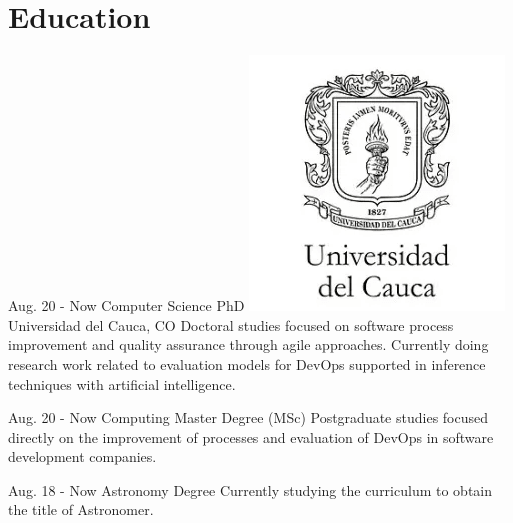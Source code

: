 \documentclass[american]{cv-class}
\begin{document}
\section{Education}
\begin{entrylist}
	\entry
	{Aug. 20 - Now}
	{Computer Science PhD}
	{{\includegraphics[scale=0.05]{img/unicauca-logo.png}} Universidad del Cauca, CO} 
	{Doctoral studies focused on software process improvement and quality assurance through agile approaches. Currently doing research work related to evaluation models for DevOps supported in inference techniques with artificial intelligence.}
	
	\entry
	{Aug. 20 - Now}
	{Computing Master Degree (MSc)}
	{ }
	{Postgraduate studies focused directly on the improvement of processes and evaluation of DevOps in software development companies.}
	
	\entry
	{Aug. 18 - Now}
	{Astronomy Degree}
	{ }
	{Currently studying the curriculum to obtain the title of Astronomer.}
	

\end{entrylist}
\end{document}
